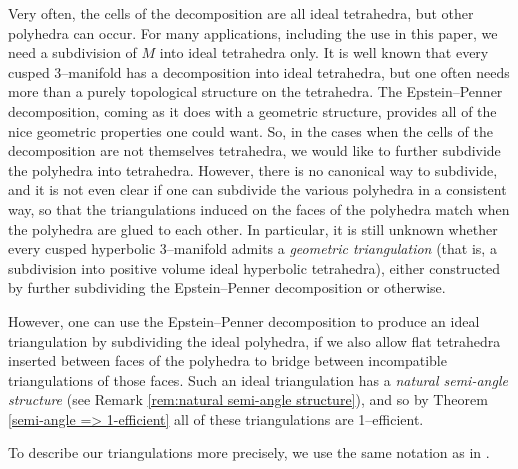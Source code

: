 \documentclass[12pt]{amsart}
\theoremstyle{definition}
\theoremstyle{remark}
\begin{document}
Very often, the cells of the decomposition are all ideal tetrahedra, but other polyhedra can occur. For many applications, including the use in this paper, we need a subdivision of $M$ into ideal tetrahedra only. It is well known that every cusped 3--manifold has a decomposition into ideal tetrahedra, but one often needs more than a purely topological structure on the tetrahedra. The Epstein--Penner decomposition, coming as it does with a geometric structure, provides all of the nice geometric properties one could want. So, in the cases when the cells of the decomposition are not themselves tetrahedra, we would like to further subdivide the polyhedra into tetrahedra. However, there is no canonical way to subdivide, and it is not even clear if one can subdivide the various polyhedra in a consistent way, so that the triangulations induced on the faces of the polyhedra match when the polyhedra are glued to each other. In particular, it is still unknown whether every cusped hyperbolic 3--manifold admits a \emph{geometric triangulation} (that is, a subdivision into positive volume ideal hyperbolic tetrahedra), either constructed by further subdividing the Epstein--Penner decomposition or otherwise.

However, one can use the Epstein--Penner decomposition to produce an ideal triangulation by subdividing the ideal polyhedra, if we also allow flat tetrahedra inserted between faces of the polyhedra to bridge between incompatible triangulations of those faces. Such an ideal triangulation has a \emph{natural semi-angle structure} (see Remark \ref{rem:natural semi-angle structure}), and so by Theorem \ref{semi-angle => 1-efficient} all of these triangulations are 1--efficient.

To describe our triangulations more precisely, we use the same notation as in \cite{HRS}.
\end{document}
